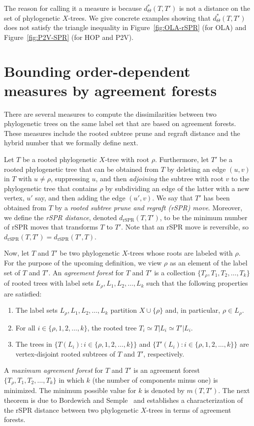 \documentclass{article}
\newcommand{\rSPR}{\mathrm{rSPR}}
\begin{document}
The reason for calling it a measure  is because $d^*_{\Theta}(T, T')$ is not a distance on the set of phylogenetic $X$-trees. We give concrete examples showing that $d^*_{\Theta}(T, T')$ does not satisfy the triangle inequality in Figure~\ref{fig:OLA-rSPR} (for OLA) and Figure~\ref{fig:P2V-SPR} (for HOP and P2V).

\section{Bounding order-dependent measures by agreement forests} \label{sec:results}

There are several measures to compute the dissimilarities between two phylogenetic trees on the same label set that are based on agreement forests. These measures include the rooted subtree prune and regraft distance  and the hybrid number that we formally define next.


Let $T$ be a rooted phylogenetic $X$-tree with root $\rho$. Furthermore, let $T'$ be a rooted phylogenetic tree that can be obtained from $T$ by deleting an edge $(u,v)$ in $T$ with $u\ne\rho$, suppressing $u$, and then {\em adjoining} the subtree with root $v$ to the phylogenetic tree that contains $\rho$ by subdividing an edge of the latter with a new vertex, $u'$ say, and then adding the edge $(u',v)$. We say that $T'$ has been
obtained from $T$ by a {\em rooted subtree prune and regraft (rSPR) move}.  
Moreover, we define the {\em rSPR distance}, denoted $d_\rSPR(T,T')$, to be the minimum number of rSPR moves that transforms $T$ to $T'$. Note that an rSPR move is reversible, so $d_\rSPR(T, T')=d_\rSPR(T', T)$. 


Now, let $T$ and $T'$ be two phylogenetic $X$-trees whose roots are labeled with $\rho$. For the purpose of the upcoming definition, we view $\rho$ as an element of the label set of $T$ and $T'$.
An {\em agreement forest} for $T$ and $T'$ is a collection $\{T_{\rho}, T_1, T_2,\ldots,T_k\}$ of rooted trees with label sets $L_{\rho}, L_1, L_2,\ldots, L_k$ such that the following properties are satisfied:
\begin{enumerate}
    \itemsep 0pt
    \item The label sets $L_{\rho}, L_1, L_2,\ldots, L_k$ partition $X \cup \{\rho\}$ and, in particular, $\rho\in L_\rho$. 
    \item For all $i\in \{\rho,1,2,\ldots,k\}$, the rooted tree $T_i \simeq T|{L_i} \simeq T'|{L_i}$. 
    \item The trees in $\{T(L_i): i\in \{\rho,1,2,\ldots,k\}\}$ and $\{T'(L_i): i\in \{\rho,1,2,\ldots,k\}\}$ are vertex-disjoint rooted subtrees of $T$ and $T'$, respectively.
\end{enumerate}
A {\em maximum agreement forest} for $T$ and $T'$ is an agreement forest $\{T_{\rho}, T_1, T_2,\ldots,T_k\}$ in which $k$ (the number of components minus one) is minimized. The minimum possible value for $k$ is denoted by $m(T,T')$. The next theorem is due to Bordewich and Semple~\cite[Theorem 2.1]{bordewichSemple2005} and establishes a characterization of the rSPR distance between two phylogenetic $X$-trees in terms of agreement forests.
\end{document}
